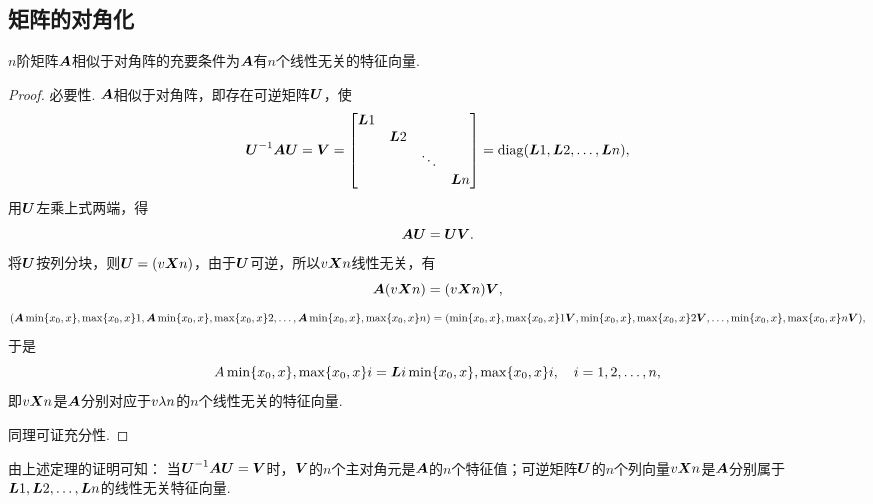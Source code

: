 \subsection{矩阵的对角化}
\begin{theorem}[矩阵可对角化的充要条件]
\(n\)阶矩阵\(\A\)相似于对角阵的充要条件为\(\A\)有\(n\)个线性无关的特征向量.
\begin{proof}
必要性.
\(\A\)相似于对角阵，即存在可逆矩阵\(\P\)，使\[
\P^{-1}\A\P=\V=\begin{bmatrix}
\L{1} \\ & \L{2} \\ & & \ddots \\ & & &\L{n}
\end{bmatrix}=\diag(\L{1},\L{2},\dotsc,\L{n}),
\]用\(\P\)左乘上式两端，得\[
\A\P=\P\V.
\]将\(\P\)按列分块，则\(\P=(\v{\x}{n})\)，由于\(\P\)可逆，所以\(\v{\x}{n}\)线性无关，有\[
\A(\v{\x}{n})=(\v{\x}{n})\V,
\]\[
(\A\X1,\A\X2,\dotsc,\A\X{n})=(\X1\V,\X2\V,\dotsc,\X{n}\V),
\]于是\[
A\X i=\L{i}\X i,
\quad i=1,2,\dotsc,n,
\]即\(\v{\x}{n}\)是\(\A\)分别对应于\(\v{\lambda}{n}\)的\(n\)个线性无关的特征向量.

同理可证充分性.
\end{proof}
\end{theorem}

由上述定理的证明可知：
{\color{red}当\(\P^{-1}\A\P=\V\)时，\(\V\)的\(n\)个主对角元是\(\A\)的\(n\)个特征值；可逆矩阵\(\P\)的\(n\)个列向量\(\v{\x}{n}\)是\(\A\)分别属于\(\L{1},\L{2},\dotsc,\L{n}\)的线性无关特征向量.}


